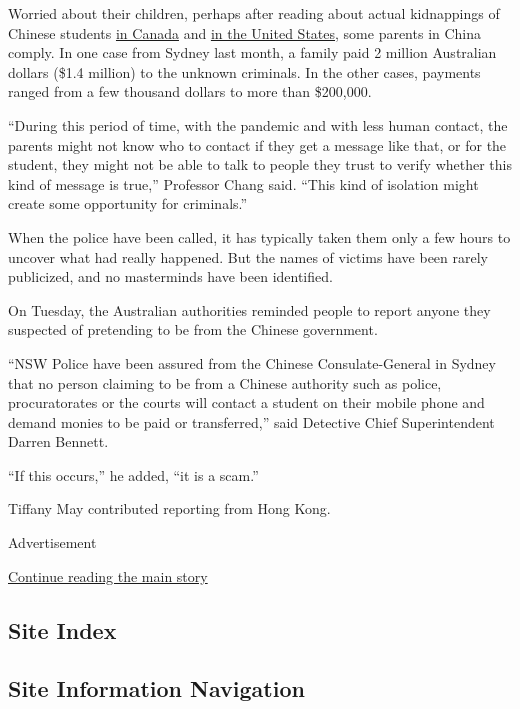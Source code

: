 Worried about their children, perhaps after reading about actual
kidnappings of Chinese students
\href{https://edition.cnn.com/2019/03/26/asia/canada-chinese-student-kidnap-intl/index.html}{in
Canada} and \href{https://www.bbc.com/news/world-us-canada-48749420}{in
the United States}, some parents in China comply. In one case from
Sydney last month, a family paid 2 million Australian dollars (\$1.4
million) to the unknown criminals. In the other cases, payments ranged
from a few thousand dollars to more than \$200,000.

``During this period of time, with the pandemic and with less human
contact, the parents might not know who to contact if they get a message
like that, or for the student, they might not be able to talk to people
they trust to verify whether this kind of message is true,'' Professor
Chang said. ``This kind of isolation might create some opportunity for
criminals.''

When the police have been called, it has typically taken them only a few
hours to uncover what had really happened. But the names of victims have
been rarely publicized, and no masterminds have been identified.

On Tuesday, the Australian authorities reminded people to report anyone
they suspected of pretending to be from the Chinese government.

``NSW Police have been assured from the Chinese Consulate-General in
Sydney that no person claiming to be from a Chinese authority such as
police, procuratorates or the courts will contact a student on their
mobile phone and demand monies to be paid or transferred,'' said
Detective Chief Superintendent Darren Bennett.

``If this occurs,'' he added, ``it is a scam.''

Tiffany May contributed reporting from Hong Kong.

Advertisement

\protect\hyperlink{after-bottom}{Continue reading the main story}

\hypertarget{site-index}{%
\subsection{Site Index}\label{site-index}}

\hypertarget{site-information-navigation}{%
\subsection{Site Information
Navigation}\label{site-information-navigation}}


